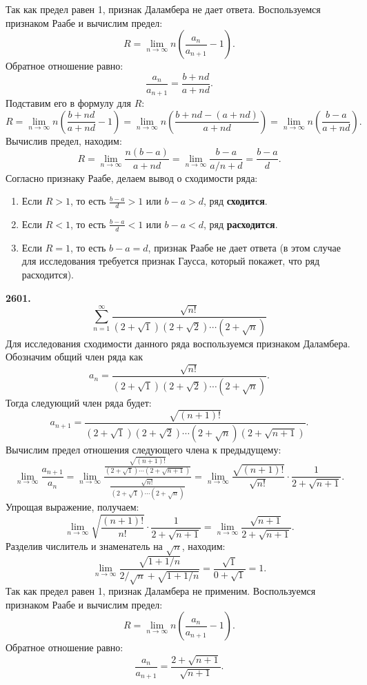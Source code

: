 \documentclass[a4paper, 12pt]{report}
\numberwithin{equation}{section}
\begin{document}
	Так как предел равен 1, признак Даламбера не дает ответа. Воспользуемся признаком Раабе и вычислим предел:
	$$ R = \lim_{n \to \infty} n \left( \frac{a_n}{a_{n+1}} - 1 \right). $$
	Обратное отношение равно:
	$$ \frac{a_n}{a_{n+1}} = \frac{b+nd}{a+nd}. $$
	Подставим его в формулу для $R$:
	$$ R = \lim_{n \to \infty} n \left( \frac{b+nd}{a+nd} - 1 \right) = \lim_{n \to \infty} n \left( \frac{b+nd - (a+nd)}{a+nd} \right) = \lim_{n \to \infty} n \left( \frac{b-a}{a+nd} \right). $$
	Вычислив предел, находим:
	$$ R = \lim_{n \to \infty} \frac{n(b-a)}{a+nd} = \lim_{n \to \infty} \frac{b-a}{a/n+d} = \frac{b-a}{d}. $$
	Согласно признаку Раабе, делаем вывод о сходимости ряда:
	\begin{enumerate}
		\item Если $R > 1$, то есть $\frac{b-a}{d} > 1$ или $b-a > d$, ряд \textbf{сходится}.
		\item Если $R < 1$, то есть $\frac{b-a}{d} < 1$ или $b-a < d$, ряд \textbf{расходится}.
		\item Если $R = 1$, то есть $b-a = d$, признак Раабе не дает ответа (в этом случае для исследования требуется признак Гаусса, который покажет, что ряд расходится).
	\end{enumerate}
	\textbf{2601.}
	$$ \sum_{n=1}^{\infty} \frac{\sqrt{n!}}{(2 + \sqrt 1)(2 + \sqrt 2) \cdots ( 2+ \sqrt n)} $$
	Для исследования сходимости данного ряда воспользуемся признаком Даламбера. Обозначим общий член ряда как
	$$ a_n = \frac{\sqrt{n!}}{(2 + \sqrt 1)(2 + \sqrt 2) \cdots ( 2+ \sqrt n)}. $$
	Тогда следующий член ряда будет:
	$$ a_{n+1} = \frac{\sqrt{(n+1)!}}{(2 + \sqrt 1)(2 + \sqrt 2) \cdots ( 2+ \sqrt n)(2 + \sqrt{n+1})}. $$
	Вычислим предел отношения следующего члена к предыдущему:
	$$ \lim_{n \to \infty} \frac{a_{n+1}}{a_n} = \lim_{n \to \infty} \frac{\frac{\sqrt{(n+1)!}}{(2 + \sqrt 1) \cdots (2 + \sqrt{n+1})}}{\frac{\sqrt{n!}}{(2 + \sqrt 1) \cdots (2 + \sqrt n)}} = \lim_{n \to \infty} \frac{\sqrt{(n+1)!}}{\sqrt{n!}} \cdot \frac{1}{2+\sqrt{n+1}}. $$
	Упрощая выражение, получаем:
	$$ \lim_{n \to \infty} \sqrt{\frac{(n+1)!}{n!}} \cdot \frac{1}{2+\sqrt{n+1}} = \lim_{n \to \infty} \frac{\sqrt{n+1}}{2+\sqrt{n+1}}. $$
	Разделив числитель и знаменатель на $\sqrt{n}$, находим:
	$$ \lim_{n \to \infty} \frac{\sqrt{1+1/n}}{2/\sqrt{n}+\sqrt{1+1/n}} = \frac{\sqrt{1}}{0+\sqrt{1}} = 1. $$
	Так как предел равен 1, признак Даламбера не применим. Воспользуемся признаком Раабе и вычислим предел:
	$$ R = \lim_{n \to \infty} n \left( \frac{a_n}{a_{n+1}} - 1 \right). $$
	Обратное отношение равно:
	$$ \frac{a_n}{a_{n+1}} = \frac{2+\sqrt{n+1}}{\sqrt{n+1}}. $$
\end{document}
